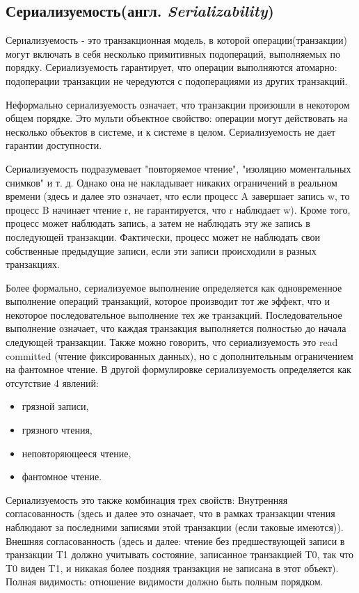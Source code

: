 \documentclass[12pt,  openany]{book}
\begin{document}
\subsection{Сериализуемость(англ.  \textit{Serializability})}
Сериализуемость - это транзакционная модель, в которой операции(транзакции) могут включать в себя несколько примитивных подопераций, выполняемых по порядку. Сериализуемость гарантирует, что операции выполняются атомарно: подоперации транзакции не чередуются с подоперациями из других транзакций.
\par
Неформально сериализуемость означает, что транзакции произошли в некотором общем порядке.
Это мульти объектное свойство: операции могут действовать на несколько объектов в системе, и к системе в целом. Сериализуемость не дает гарантии доступности.
\par
Сериализуемость подразумевает "повторяемое чтение", "изоляцию моментальных снимков" и т. д. Однако она не накладывает никаких ограничений в реальном времени (здесь и далее это означает, что если процесс A завершает запись w, то процесс B начинает чтение r, не гарантируется, что r наблюдает w).
Кроме того, процесс может наблюдать запись, а затем не наблюдать эту же запись в последующей транзакции. Фактически, процесс может не наблюдать свои собственные предыдущие записи, если эти записи происходили в разных транзакциях.
\par
Более формально, сериализуемое выполнение определяется как одновременное выполнение операций транзакций, которое производит тот же эффект, что и некоторое последовательное выполнение тех же транзакций. Последовательное выполнение означает, что каждая транзакция выполняется полностью до начала следующей транзакции.
Также можно говорить, что сериализуемость это read committed (чтение фиксированных данных), но с дополнительным ограничением на фантомное чтение.
В другой формулировке сериализуемость определяется как отсутствие 4 явлений:
\begin{itemize}
  \item грязной записи,
  \item грязного чтения,
  \item неповторяющееся чтение,
  \item фантомное чтение.
\end{itemize}
Сериализуемость это также комбинация трех свойств:
Внутренняя согласованность (здесь и далее это означает, что в рамках транзакции чтения наблюдают за последними записями этой транзакции (если таковые имеются)).
Внешняя согласованность (здесь и далее: чтение без предшествующей записи в транзакции T1 должно учитывать состояние, записанное транзакцией T0, так что T0 виден T1, и никакая более поздняя транзакция не записана в этот объект).
Полная видимость: отношение видимости должно быть полным порядком.
\end{document}
